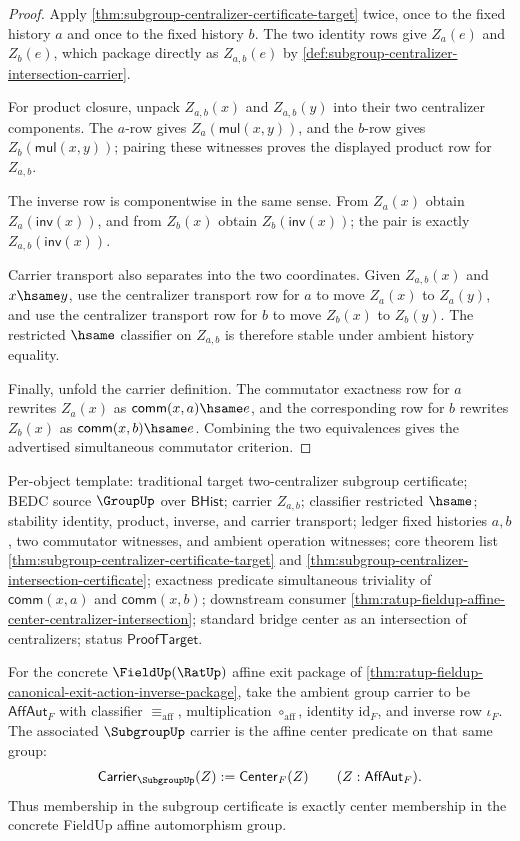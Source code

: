 \begin{proof}
Apply \autoref{thm:subgroup-centralizer-certificate-target} twice, once to
the fixed history $a$ and once to the fixed history $b$. The two identity
rows give $Z_a(e)$ and $Z_b(e)$, which package directly as $Z_{a,b}(e)$ by
\autoref{def:subgroup-centralizer-intersection-carrier}.

For product closure, unpack $Z_{a,b}(x)$ and $Z_{a,b}(y)$ into their two
centralizer components. The $a$-row gives
$Z_a(\mathsf{mul}(x,y))$, and the $b$-row gives
$Z_b(\mathsf{mul}(x,y))$; pairing these witnesses proves the displayed
product row for $Z_{a,b}$.

The inverse row is componentwise in the same sense. From $Z_a(x)$ obtain
$Z_a(\mathsf{inv}(x))$, and from $Z_b(x)$ obtain
$Z_b(\mathsf{inv}(x))$; the pair is exactly
$Z_{a,b}(\mathsf{inv}(x))$.

Carrier transport also separates into the two coordinates. Given
$Z_{a,b}(x)$ and $x\hsame y$, use the centralizer transport row for $a$ to
move $Z_a(x)$ to $Z_a(y)$, and use the centralizer transport row for $b$ to
move $Z_b(x)$ to $Z_b(y)$. The restricted $\hsame$ classifier on
$Z_{a,b}$ is therefore stable under ambient history equality.

Finally, unfold the carrier definition. The commutator exactness row for
$a$ rewrites $Z_a(x)$ as $\mathsf{comm}(x,a)\hsame e$, and the corresponding
row for $b$ rewrites $Z_b(x)$ as $\mathsf{comm}(x,b)\hsame e$. Combining the
two equivalences gives the advertised simultaneous commutator criterion.
\end{proof}

Per-object template: traditional target two-centralizer subgroup certificate;
BEDC source $\GroupUp$ over $\mathsf{BHist}$; carrier $Z_{a,b}$; classifier
restricted $\hsame$; stability identity, product, inverse, and carrier
transport; ledger fixed histories $a,b$, two commutator witnesses, and
ambient operation witnesses; core theorem list
\autoref{thm:subgroup-centralizer-certificate-target} and
\autoref{thm:subgroup-centralizer-intersection-certificate}; exactness
predicate simultaneous triviality of $\mathsf{comm}(x,a)$ and
$\mathsf{comm}(x,b)$; downstream consumer
\autoref{thm:ratup-fieldup-affine-center-centralizer-intersection}; standard
bridge center as an intersection of centralizers; status
$\mathsf{ProofTarget}$.

\begin{definition}
\label{def:ratup-fieldup-affine-center-subgroup-carrier}
For the concrete $\FieldUp(\RatUp)$ affine exit package of
\autoref{thm:ratup-fieldup-canonical-exit-action-inverse-package}, take the
ambient group carrier to be $\mathsf{AffAut}_F$ with classifier
$\equiv_{\mathrm{aff}}$, multiplication $\circ_{\mathrm{aff}}$, identity
$\mathrm{id}_F$, and inverse row $\iota_F$. The associated $\SubgroupUp$
carrier is the affine center predicate on that same group:
$$
\mathsf{Carrier}_{\SubgroupUp}(Z) := \mathsf{Center}_F(Z)
\qquad (Z:\mathsf{AffAut}_F).
$$
Thus membership in the subgroup certificate is exactly center membership in
the concrete FieldUp affine automorphism group.
\end{definition}

